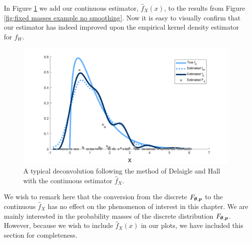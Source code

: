 

	In Figure \ref{fig:fixed masses example alone} we add our continuous estimator, $\hat{f}_X(x)$, to the results from Figure \ref{fig:fixed masses example no smoothing}. Now it is easy to visually confirm that our estimator has indeed improved upon the empirical kernel density estimator for $f_W$.

	\begin{figure}
		\centering
		\includegraphics[width = \textwidth]{Figures/Deconvolution/fixed_masses_example.png}
		\caption{A typical deconvolution following the method of Delaigle and Hall \cite{Delaigle2016-la} with the continuous estimator $\hat{f}_X$.}
		\label{fig:fixed masses example alone}
	\end{figure}

	We wish to remark here that the conversion from the discrete $F_{{\bm{{\theta}}}, {\bm{{p}}}}$ to the continuous $\hat{f}_X$ has no effect on the phenomenon of interest in this chapter. We are mainly interested in the probability masses of the discrete distribution $F_{{\bm{{\theta}}}, {\bm{{p}}}}$. However, because we wish to include $\hat{f}_X(x)$ in our plots, we have included this section for completeness.

	





